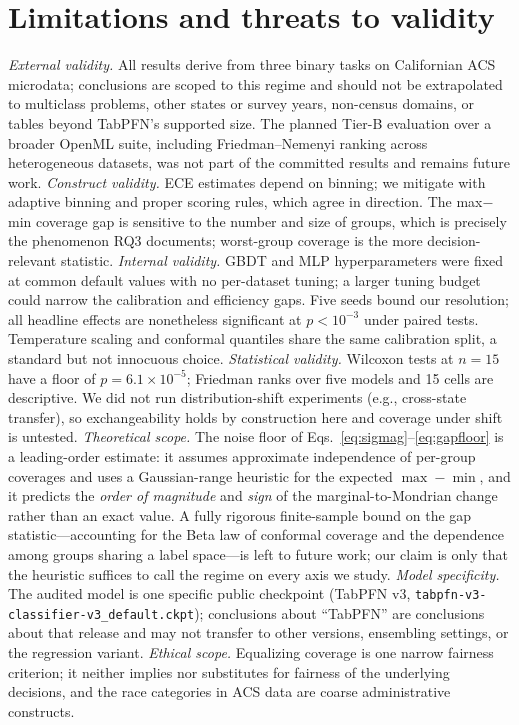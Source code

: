 \documentclass[review,12pt]{elsarticle}
\begin{document}
\section{Limitations and threats to validity}
\label{sec:limitations}

\emph{External validity.} All results derive from three binary tasks on Californian ACS microdata; conclusions are scoped to this regime and should not be extrapolated to multiclass problems, other states or survey years, non-census domains, or tables beyond TabPFN's supported size. The planned Tier-B evaluation over a broader OpenML suite, including Friedman--Nemenyi ranking across heterogeneous datasets, was not part of the committed results and remains future work. \emph{Construct validity.} ECE estimates depend on binning; we mitigate with adaptive binning and proper scoring rules, which agree in direction. The max$-$min coverage gap is sensitive to the number and size of groups, which is precisely the phenomenon RQ3 documents; worst-group coverage is the more decision-relevant statistic. \emph{Internal validity.} GBDT and MLP hyperparameters were fixed at common default values with no per-dataset tuning; a larger tuning budget could narrow the calibration and efficiency gaps. Five seeds bound our resolution; all headline effects are nonetheless significant at $p<10^{-3}$ under paired tests. Temperature scaling and conformal quantiles share the same calibration split, a standard but not innocuous choice. \emph{Statistical validity.} Wilcoxon tests at $n=15$ have a floor of $p=6.1\times10^{-5}$; Friedman ranks over five models and 15 cells are descriptive. We did not run distribution-shift experiments (e.g., cross-state transfer), so exchangeability holds by construction here and coverage under shift is untested. \emph{Theoretical scope.} The noise floor of Eqs.~\eqref{eq:sigmag}--\eqref{eq:gapfloor} is a leading-order estimate: it assumes approximate independence of per-group coverages and uses a Gaussian-range heuristic for the expected $\max-\min$, and it predicts the \emph{order of magnitude} and \emph{sign} of the marginal-to-Mondrian change rather than an exact value. A fully rigorous finite-sample bound on the gap statistic---accounting for the Beta law of conformal coverage and the dependence among groups sharing a label space---is left to future work; our claim is only that the heuristic suffices to call the regime on every axis we study. \emph{Model specificity.} The audited model is one specific public checkpoint (TabPFN v3, \texttt{tabpfn-v3-classifier-v3\_default.ckpt}); conclusions about ``TabPFN'' are conclusions about that release and may not transfer to other versions, ensembling settings, or the regression variant. \emph{Ethical scope.} Equalizing coverage is one narrow fairness criterion; it neither implies nor substitutes for fairness of the underlying decisions, and the race categories in ACS data are coarse administrative constructs.
\end{document}

